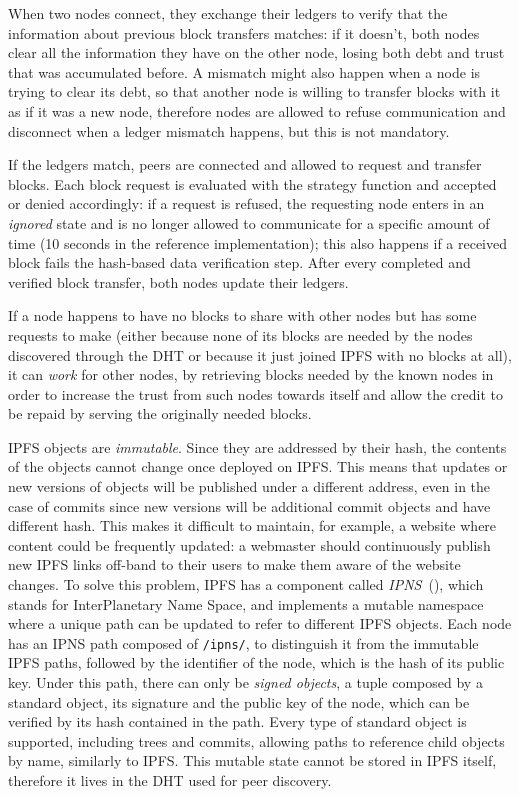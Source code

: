 \documentclass[mscthesis]{usiinfthesis}
\begin{document}
When two nodes connect, they exchange their ledgers to verify that the information about previous block transfers matches: if it doesn't, both nodes clear all the information they have on the other node, losing both debt and trust that was accumulated before. A mismatch might also happen when a node is trying to clear its debt, so that another node is willing to transfer blocks with it as if it was a new node, therefore nodes are allowed to refuse communication and disconnect when a ledger mismatch happens, but this is not mandatory.

If the ledgers match, peers are connected and allowed to request and transfer blocks. Each block request is evaluated with the strategy function and accepted or denied accordingly: if a request is refused, the requesting node enters in an \textit{ignored} state and is no longer allowed to communicate for a specific amount of time (10 seconds in the reference implementation); this also happens if a received block fails the hash-based data verification step. After every completed and verified block transfer, both nodes update their ledgers.

If a node happens to have no blocks to share with other nodes but has some requests to make (either because none of its blocks are needed by the nodes discovered through the DHT or because it just joined IPFS with no blocks at all), it can \textit{work} for other nodes, by retrieving blocks needed by the known nodes in order to increase the trust from such nodes towards itself and allow the credit to be repaid by serving the originally needed blocks.

IPFS objects are \emph{immutable}. Since they are addressed by their hash, the contents of the objects cannot change once deployed on IPFS. This means that updates or new versions of objects will be published under a different address, even in the case of commits since new versions will be additional commit objects and have different hash. This makes it difficult to maintain, for example, a website where content could be frequently updated: a webmaster should continuously publish new IPFS links off-band to their users to make them aware of the website changes. To solve this problem, IPFS has a component called \emph{IPNS}~(\cite{benet2014ipfs}), which stands for InterPlanetary Name Space, and implements a mutable namespace where a unique path can be updated to refer to different IPFS objects. Each node has an IPNS path composed of \texttt{/ipns/}, to distinguish it from the immutable IPFS paths, followed by the identifier of the node, which is the hash of its public key. Under this path, there can only be \textit{signed objects}, a tuple composed by a standard object, its signature and the public key of the node, which can be verified by its hash contained in the path. Every type of standard object is supported, including trees and commits, allowing paths to reference child objects by name, similarly to IPFS. This mutable state cannot be stored in IPFS itself, therefore it lives in the DHT used for peer discovery.
\end{document}

